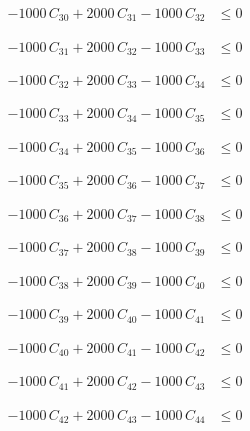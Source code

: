 \documentclass[a4paper,11pt]{article}
\begin{document}
\begin{align}
-1000\,C_{30} + 2000\,C_{31} - 1000\,C_{32} &\leq 0 \nonumber
\end{align}

\begin{align}
-1000\,C_{31} + 2000\,C_{32} - 1000\,C_{33} &\leq 0 \nonumber
\end{align}

\begin{align}
-1000\,C_{32} + 2000\,C_{33} - 1000\,C_{34} &\leq 0 \nonumber
\end{align}

\begin{align}
-1000\,C_{33} + 2000\,C_{34} - 1000\,C_{35} &\leq 0 \nonumber
\end{align}

\begin{align}
-1000\,C_{34} + 2000\,C_{35} - 1000\,C_{36} &\leq 0 \nonumber
\end{align}

\begin{align}
-1000\,C_{35} + 2000\,C_{36} - 1000\,C_{37} &\leq 0 \nonumber
\end{align}

\begin{align}
-1000\,C_{36} + 2000\,C_{37} - 1000\,C_{38} &\leq 0 \nonumber
\end{align}

\begin{align}
-1000\,C_{37} + 2000\,C_{38} - 1000\,C_{39} &\leq 0 \nonumber
\end{align}

\begin{align}
-1000\,C_{38} + 2000\,C_{39} - 1000\,C_{40} &\leq 0 \nonumber
\end{align}

\begin{align}
-1000\,C_{39} + 2000\,C_{40} - 1000\,C_{41} &\leq 0 \nonumber
\end{align}

\begin{align}
-1000\,C_{40} + 2000\,C_{41} - 1000\,C_{42} &\leq 0 \nonumber
\end{align}

\begin{align}
-1000\,C_{41} + 2000\,C_{42} - 1000\,C_{43} &\leq 0 \nonumber
\end{align}

\begin{align}
-1000\,C_{42} + 2000\,C_{43} - 1000\,C_{44} &\leq 0 \nonumber
\end{align}
\end{document}
